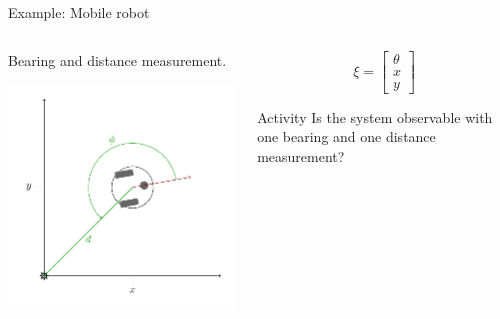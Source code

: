 \documentclass[presentation,aspectratio=169]{beamer}
\begin{document}
\begin{frame}[label={sec:orgd28397b}]{Example: Mobile robot}
\begin{columns}
\begin{column}{0.4\columnwidth}
Bearing and distance measurement.

\begin{center}
 \includegraphics[width=1.0\linewidth]{../../figures/unicycle-model-bearing-distance}
\end{center}
\end{column}
\begin{column}{0.6\columnwidth}
\[ \xi = \begin{bmatrix} \theta\\x\\y \end{bmatrix}\]

\pause


\alert{Activity} Is the system observable with one bearing and one distance measurement?
\end{column}
\end{columns}
\end{frame}
\end{document}
